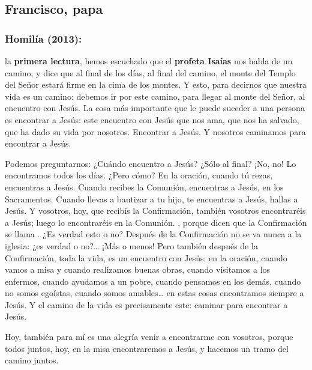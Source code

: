 \newsection

\subsection{Francisco, papa}

\subsubsection{Homilía (2013):}


\begin{body}
	 la \textbf{primera lectura}, hemos escuchado que el \textbf{profeta Isaías} nos habla de un camino, y dice que al final de los días, al final del camino, el monte del Templo del Señor estará firme en la cima de los montes. Y esto, para decirnos que nuestra vida es un camino: debemos ir por este camino, para llegar al monte del Señor, al encuentro con Jesús. La cosa más importante que le puede suceder a una persona es encontrar a Jesús: este encuentro con Jesús que nos ama, que nos ha salvado, que ha dado su vida por nosotros. Encontrar a Jesús. Y nosotros caminamos para encontrar a Jesús. 
	
	Podemos preguntarnos: ¿Cuándo encuentro a Jesús? ¿Sólo al final? ¡No, no! Lo encontramos todos los días. ¿Pero cómo? En la oración, cuando tú rezas, encuentras a Jesús. Cuando recibes la Comunión, encuentras a Jesús, en los Sacramentos. Cuando llevas a bautizar a tu hijo, te encuentras a Jesús, hallas a Jesús. Y vosotros, hoy, que recibís la Confirmación, también vosotros encontraréis a Jesús; luego lo encontraréis en la Comunión. , porque dicen que la Confirmación se llama . ¿Es verdad esto o no? Después de la Confirmación no se va nunca a la iglesia: ¿es verdad o no?\ldots{} ¡Más o menos! Pero también después de la Confirmación, toda la vida, es un encuentro con Jesús: en la oración, cuando vamos a misa y cuando realizamos buenas obras, cuando visitamos a los enfermos, cuando ayudamos a un pobre, cuando pensamos en los demás, cuando no somos egoístas, cuando somos amables\ldots{} en estas cosas encontramos siempre a Jesús. Y el camino de la vida es precisamente este: caminar para encontrar a Jesús. 
	
	Hoy, también para mí es una alegría venir a encontrarme con vosotros, porque todos juntos, hoy, en la misa encontraremos a Jesús, y hacemos un tramo del camino juntos. 
	

\end{body}
